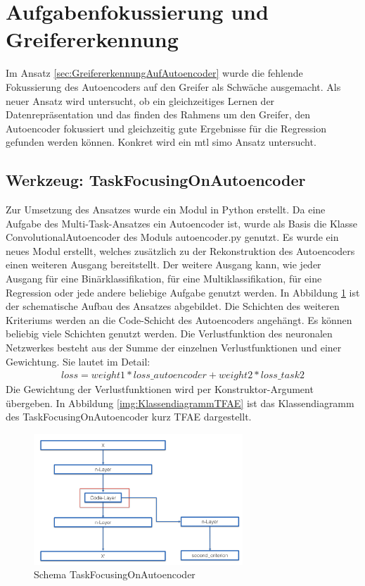	
	
	\section{Aufgabenfokussierung und Greifererkennung}
	\label{sec:MultiTaskGreifererkennung}
	Im Ansatz \ref{sec:GreifererkennungAufAutoencoder} wurde die fehlende Fokussierung des Autoencoders auf den Greifer als Schwäche ausgemacht. Als neuer Ansatz wird untersucht, ob ein gleichzeitiges Lernen der Datenrepräsentation und das finden des Rahmens um den Greifer, den Autoencoder fokussiert und gleichzeitig gute Ergebnisse für die Regression gefunden werden können. Konkret wird ein \ac{mtl} \ac{simo} Ansatz untersucht.  
	
	\subsection{Werkzeug: TaskFocusingOnAutoencoder}
	\label{subsec:SecondCriterionAutoenocder}
	Zur Umsetzung des Ansatzes wurde ein Modul in Python erstellt. Da eine Aufgabe des Multi-Task-Ansatzes ein Autoencoder ist, wurde als Basis die Klasse ConvolutionalAutoencoder des Moduls autoencoder.py genutzt. Es wurde ein neues Modul erstellt, welches zusätzlich zu der Rekonstruktion des Autoencoders einen weiteren Ausgang bereitstellt. Der weitere Ausgang kann, wie jeder Ausgang für eine Binärklassifikation, für eine Multiklassifikation, für eine Regression oder jede andere beliebige Aufgabe genutzt werden. In Abbildung \ref{img:SchemaTFAE} ist der schematische Aufbau des Ansatzes abgebildet. Die Schichten des weiteren Kriteriums werden an die Code-Schicht des Autoencoders angehängt. Es können beliebig viele Schichten genutzt werden. Die Verlustfunktion des neuronalen Netzwerkes besteht aus der Summe der einzelnen Verlustfunktionen und einer Gewichtung. Sie lautet im Detail: 
	\begin{align}
	loss = weight1 * loss\_autoencoder + weight2 * loss\_task2
	\end{align}
	Die Gewichtung der Verlustfunktionen wird per Konstruktor-Argument übergeben. In Abbildung \ref{img:KlassendiagrammTFAE} ist das Klassendiagramm des TaskFocusingOnAutoencoder kurz TFAE dargestellt.
	\begin{figure}[h]
		\centering
		\includegraphics[width=0.7\textwidth, center]{bilder/Schema_Autoencoders/Schema_SCAE.png}
		\caption[Schema TaskFocusingOnAutoencoder]{Schema TaskFocusingOnAutoencoder}
		\label{img:SchemaTFAE}
	\end{figure}  
